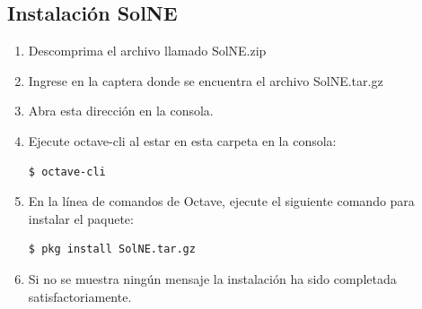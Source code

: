 \documentclass[12pt]{article}
\begin{document}
\subsection{Instalación SolNE}
\begin{enumerate}
	\item Descomprima el archivo llamado SolNE.zip
	\item Ingrese en la captera donde se encuentra el archivo SolNE.tar.gz
	\item Abra esta dirección en la consola.
	\item Ejecute octave-cli al estar en esta carpeta en la consola:
\begin{lstlisting}[language=bash]
  $ octave-cli
\end{lstlisting}
	\item En la línea de comandos de Octave, ejecute el siguiente comando para instalar el paquete:
\begin{lstlisting}[language=bash]
  $ pkg install SolNE.tar.gz
\end{lstlisting}	
	\item Si no se muestra ningún mensaje la instalación ha sido completada satisfactoriamente. 
\end{enumerate}
\end{document}
